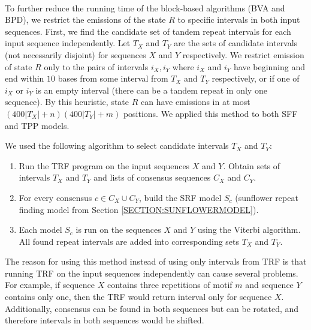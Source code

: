 \paragraph{}
To further reduce the running time of the block-based algorithms (BVA and BPD),
we restrict the emissions of the state $R$ to specific intervals in both input
sequences. First, we find the candidate set of tandem repeat intervals for
each input sequence independently. Let $T_X$ and $T_Y$ are the
sets of candidate intervals (not necessarily disjoint) for sequences $X$ and
$Y$ respectively. We restrict emission of state $R$ only to the pairs of
intervals $i_X, i_Y$ where $i_X$ and $i_Y$ have beginning and end within $10$
bases from some interval from $T_X$ and $T_Y$ respectively, or if one of $i_X$
or $i_Y$ is an empty interval (there can be a tandem repeat in only one
sequence).  By this heuristic, state $R$ can have emissions in at most
$(400|T_X|+n)(400|T_Y|+m)$ positions. We applied this method to both SFF and
TPP models.

We used the following algorithm to select candidate intervals $T_X$ and $T_Y$:
\begin{enumerate}[itemsep=-1mm]
\item Run the TRF program on the input sequences $X$ and $Y$. Obtain sets of
intervals $T_X$ and $T_Y$ and lists of consensus sequences $C_X$ and $C_Y$.

\item For every consensus $c\in C_X\cup C_Y$, build the SRF model $S_c$
(sunflower repeat finding model from Section \ref{SECTION:SUNFLOWERMODEL}). 

\item Each model $S_c$ is run on the sequences $X$ and $Y$ using the Viterbi
algorithm. All found repeat intervals are added into corresponding sets $T_X$
and $T_Y$.

\end{enumerate}
The reason for using this method instead of using only intervals from TRF is
that running TRF on the input sequences independently can cause several
problems. For example, if sequence $X$ contains three repetitions of motif $m$
and sequence $Y$ contains only one, then the TRF would return interval only for
sequence $X$. Additionally, consensus can be found in both sequences but can be
rotated, and therefore intervals in both sequences would be shifted.


